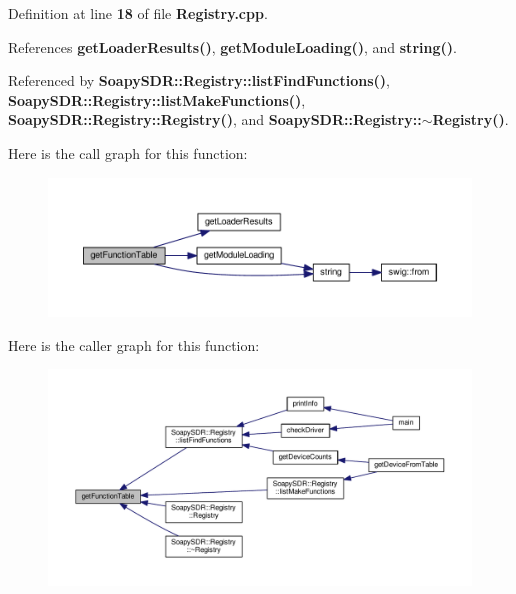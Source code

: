 Definition at line {\bf 18} of file {\bf Registry.\+cpp}.



References {\bf get\+Loader\+Results()}, {\bf get\+Module\+Loading()}, and {\bf string()}.



Referenced by {\bf Soapy\+S\+D\+R\+::\+Registry\+::list\+Find\+Functions()}, {\bf Soapy\+S\+D\+R\+::\+Registry\+::list\+Make\+Functions()}, {\bf Soapy\+S\+D\+R\+::\+Registry\+::\+Registry()}, and {\bf Soapy\+S\+D\+R\+::\+Registry\+::$\sim$\+Registry()}.



Here is the call graph for this function\+:
\nopagebreak
\begin{figure}[H]
\begin{center}
\leavevmode
\includegraphics[width=350pt]{d6/d4f/Registry_8cpp_aa302ff85a67f618a5aeee50b2a6486e2_cgraph}
\end{center}
\end{figure}




Here is the caller graph for this function\+:
\nopagebreak
\begin{figure}[H]
\begin{center}
\leavevmode
\includegraphics[width=350pt]{d6/d4f/Registry_8cpp_aa302ff85a67f618a5aeee50b2a6486e2_icgraph}
\end{center}
\end{figure}


